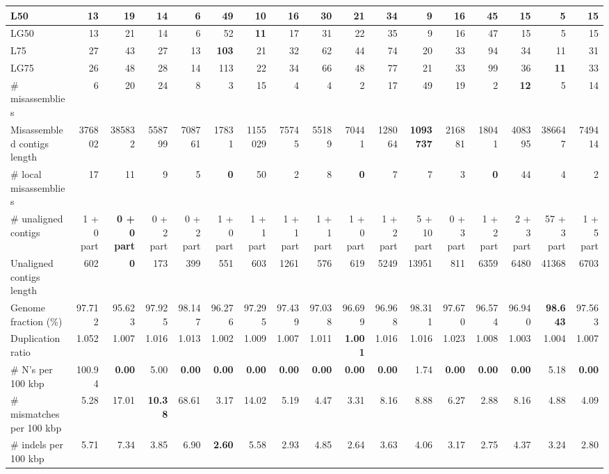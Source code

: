 \documentclass[12pt,a4paper]{article}
\begin{document}
\begin{table}[ht]
\begin{center}
\begin{tabular}{|l*{16}{|r}|}
L50 & 13 & 19 & 14 & 6 & 49 & {\bf 10} & 16 & 30 & 21 & 34 & 9 & 16 & 45 & 15 & 5 & 15 \\ \hline
LG50 & 13 & 21 & 14 & 6 & 52 & {\bf 11} & 17 & 31 & 22 & 35 & 9 & 16 & 47 & 15 & 5 & 15 \\ \hline
L75 & 27 & 43 & 27 & 13 & {\bf 103} & 21 & 32 & 62 & 44 & 74 & 20 & 33 & 94 & 34 & 11 & 31 \\ \hline
LG75 & 26 & 48 & 28 & 14 & 113 & 22 & 34 & 66 & 48 & 77 & 21 & 33 & 99 & 36 & {\bf 11} & 33 \\ \hline
\# misassemblies & 6 & 20 & 24 & 8 & 3 & 15 & 4 & 4 & 2 & 17 & 49 & 19 & 2 & {\bf 12} & 5 & 14 \\ \hline
Misassembled contigs length & 376802 & 385832 & 558799 & 708761 & 17831 & 1155029 & 75745 & 55189 & 70441 & 128064 & {\bf 1093737} & 216881 & 18041 & 408395 & 386647 & 749414 \\ \hline
\# local misassemblies & 17 & 11 & 9 & 5 & {\bf 0} & 50 & 2 & 8 & {\bf 0} & 7 & 7 & 3 & {\bf 0} & 44 & 4 & 2 \\ \hline
\# unaligned contigs & 1 + 0 part & {\bf 0 + 0 part} & 0 + 2 part & 0 + 2 part & 1 + 0 part & 1 + 1 part & 1 + 1 part & 1 + 1 part & 1 + 0 part & 1 + 2 part & 5 + 10 part & 0 + 3 part & 1 + 2 part & 2 + 3 part & 57 + 3 part & 1 + 5 part \\ \hline
Unaligned contigs length & 602 & {\bf 0} & 173 & 399 & 551 & 603 & 1261 & 576 & 619 & 5249 & 13951 & 811 & 6359 & 6480 & 41368 & 6703 \\ \hline
Genome fraction (\%) & 97.712 & 95.623 & 97.925 & 98.147 & 96.276 & 97.295 & 97.439 & 97.038 & 96.699 & 96.968 & 98.311 & 97.670 & 96.574 & 96.940 & {\bf 98.643} & 97.563 \\ \hline
Duplication ratio & 1.052 & 1.007 & 1.016 & 1.013 & 1.002 & 1.009 & 1.007 & 1.011 & {\bf 1.001} & 1.016 & 1.016 & 1.023 & 1.008 & 1.003 & 1.004 & 1.007 \\ \hline
\# N's per 100 kbp & 100.94 & {\bf 0.00} & 5.00 & {\bf 0.00} & {\bf 0.00} & {\bf 0.00} & {\bf 0.00} & {\bf 0.00} & {\bf 0.00} & {\bf 0.00} & 1.74 & {\bf 0.00} & {\bf 0.00} & {\bf 0.00} & 5.18 & {\bf 0.00} \\ \hline
\# mismatches per 100 kbp & 5.28 & 17.01 & {\bf 10.38} & 68.61 & 3.17 & 14.02 & 5.19 & 4.47 & 3.31 & 8.16 & 8.88 & 6.27 & 2.88 & 8.16 & 4.88 & 4.09 \\ \hline
\# indels per 100 kbp & 5.71 & 7.34 & 3.85 & 6.90 & {\bf 2.60} & 5.58 & 2.93 & 4.85 & 2.64 & 3.63 & 4.06 & 3.17 & 2.75 & 4.37 & 3.24 & 2.80 \\ \hline

\end{tabular}
\end{center}
\end{table}
\end{document}
